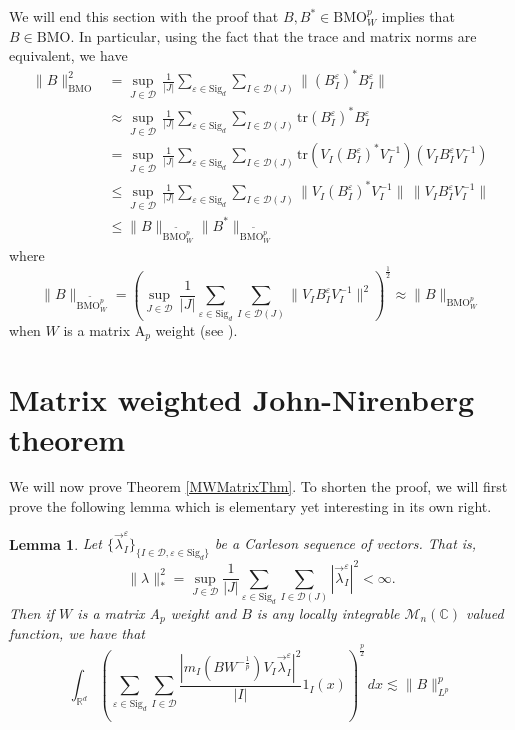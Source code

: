 \documentclass[12pt,reqno ]{amsart}
\numberwithin{equation}{section}
\newtheorem{lemma}[theorem]{Lemma}
\theoremstyle{definition}
\newcommand{\Rd}{\ensuremath{\mathbb{R}^d}}
\newcommand{\D}{\ensuremath{\mathscr{D}}}
\newcommand{\BMOW}{\ensuremath{{\text{BMO}}_W ^p}}
\newcommand{\Mn}{\ensuremath{\mathcal{M}_{n }}(\mathbb{C})}
\newcommand{\V}[1]{\ensuremath{\vec{#1}}}
\newcommand{\inrd}{\ensuremath{\int_{\Rd}}}
\newcommand{\tr}{\ensuremath{\text{tr}}}
\newcommand{\W}[1]{\ensuremath{\widetilde{#1}}}
\renewcommand{\S}{\ensuremath{\text{Sig}_d}}
\begin{document}
We will end this section with the proof that $B, B^* \in \BMOW$ implies that $B \in \text{BMO}$.  In particular, using the fact that the trace and matrix norms are equivalent, we have \begin{align*} \|B\|_{\text{BMO}} ^2  & = \sup_{J \in \D} \, \frac{1}{|J|}  \sum_{\varepsilon \in \S} \sum_{I \in \D(J)} \|(B_I^\varepsilon) ^* B_I ^\varepsilon \|  \\ & \approx \sup_{J \in \D} \, \frac{1}{|J|}  \sum_{\varepsilon \in \S}  \sum_{I \in \D(J)}  \tr (B_I ^\varepsilon) ^* B_I ^\varepsilon  \\ & =
\sup_{J \in \D} \, \frac{1}{|J|}  \sum_{\varepsilon \in \S}  \sum_{I \in \D(J)}  \tr (V_I (B_I ^\varepsilon) ^* V_I ^{-1}) (V_I  B_I ^\varepsilon V_I^{-1})
\\ & \leq \sup_{J \in \D} \, \frac{1}{|J|}  \sum_{\varepsilon \in \S}  \sum_{I \in \D(J)}  \|V_I (B_I ^\varepsilon) ^* V_I ^{-1}\|  \,  \|V_I  B_I ^\varepsilon V_I^{-1}\| \\ & \leq \|B\|_{\W{\BMOW}} \|B^*\|_{\W{\BMOW}} \end{align*}
where \begin{equation*}\|B\|_{\W{\BMOW}} = \left( \sup_{J \in \D} \, \frac{1}{|J|}  \sum_{\varepsilon \in \S}  \sum_{I \in \D(J)}  \|V_I B_I ^\varepsilon V_I ^{-1}\| ^2 \right)^\frac12 \approx \|B\|_{\BMOW}  \end{equation*} when $W$ is a matrix A${}_p$ weight (see \cite{IKP}).

\section{Matrix weighted John-Nirenberg theorem}





We will now prove Theorem \ref{MWMatrixThm}.  To shorten the proof, we will first prove the following lemma     which is elementary yet interesting in its own right.

\begin{lemma}  \label{EmbeddingLem} Let $\{\V{\lambda}_I ^\varepsilon\}_{\{I \in \D, \varepsilon \in \S\}}$ be a Carleson sequence of vectors.  That is,  \begin{equation*}\|\lambda\|_* ^2 =  \sup_{J \in \D} \frac{1}{|J|} \sum_{\varepsilon \in \S} \sum_{I \in \D(J)} |\V{\lambda}_I ^\varepsilon |^2  < \infty. \end{equation*}  Then if $W$ is a matrix A${}_p$ weight and $B$ is any locally integrable $\Mn$ valued function, we have that \begin{equation*} \inrd \left(\sum_{\varepsilon \in \S} \sum_{I \in \D} \frac{|m_I ( B W^{- \frac{1}{p}}  )  V_I \V{\lambda}_I ^\varepsilon  |^2}{|I|} 1_I (x) \right)^\frac{p}{2} \, dx \lesssim \|B\|_{L^{p}} ^p\end{equation*} \end{lemma}
\end{document}
